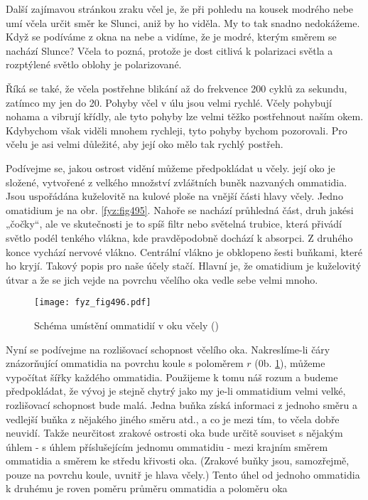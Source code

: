     Další zajímavou stránkou zraku včel je, že při pohledu na kousek modrého nebe umí včela určit
    směr ke Slunci, aniž by ho viděla. My to tak snadno nedokážeme. Když se podíváme z okna na nebe
    a vidíme, že je modré, kterým směrem se nachází Slunce? Včela to pozná, protože je dost citlivá
    k polarizaci světla a rozptýlené světlo oblohy je polarizované.
    
    Říká se také, že včela postřehne blikání až do frekvence 200 cyklů za sekundu, zatímco my jen do
    20. Pohyby včel v úlu jsou velmi rychlé. Včely pohybují nohama a vibrují křídly, ale tyto pohyby
    lze velmi těžko postřehnout naším okem. Kdybychom však viděli mnohem rychleji, tyto pohyby
    bychom pozorovali. Pro včelu je asi velmi důležité, aby její oko mělo tak rychlý postřeh. 
    
    Podívejme se, jakou ostrost vidění můžeme předpokládat u včely. její oko je složené, vytvořené z
    velkého množství zvláštních buněk nazvaných ommatidia. Jsou uspořádána kuželovitě na kulové
    ploše na vnější části hlavy včely. Jedno omatidium je na obr. \ref{fyz:fig495}.  Nahoře se
    nachází průhledná část, druh jakési „čočky“, ale ve skutečnosti je to spíš filtr nebo světelná
    trubice, která přivádí světlo podél tenkého vlákna, kde pravděpodobně dochází k absorpci. Z
    druhého konce vychází nervové vlákno. Centrální vlákno je obklopeno šesti buňkami, které ho
    kryjí. Takový popis pro naše účely stačí. Hlavní je, že omatidium je kuželovitý útvar a že se
    jich vejde na povrchu včelího oka vedle sebe velmi mnoho.

    \begin{figure}[ht!] %
      \centering
      \texttt{[image: fyz\_fig496.pdf]}
      \caption{Schéma umístění ommatidií v oku včely (\cite[s.~697]{Feynman01})}
      \label{fyz:fig496}
    \end{figure}

    Nyní se podívejme na rozlišovací schopnost včelího oka. Nakreslíme-li čáry znázorňující
    ommatidia na povrchu koule s poloměrem \(r\) (0b. \ref{fyz:fig496}), můžeme vypočítat šířky
    každého ommatidia. Použijeme k tomu náš rozum a budeme předpokládat, že vývoj je stejně chytrý
    jako my je-li ommatidium velmi velké, rozlišovací schopnost bude malá. Jedna buňka získá
    informaci z jednoho směru a vedlejší buňka z nějakého jiného směru atd., a co je mezi tím, to
    včela dobře neuvidí. Takže neurčitost zrakové ostrosti oka bude určitě souviset s nějakým úhlem
    - s úhlem příslušejícím jednomu ommatidiu - mezi krajním směrem ommatidia a směrem ke středu
    křivosti oka. (Zrakové buňky jsou, samozřejmě, pouze na povrchu koule, uvnitř je hlava včely.)
    Tento úhel od jednoho ommatidia k druhému je roven poměru průměru ommatidia a poloměru oka

